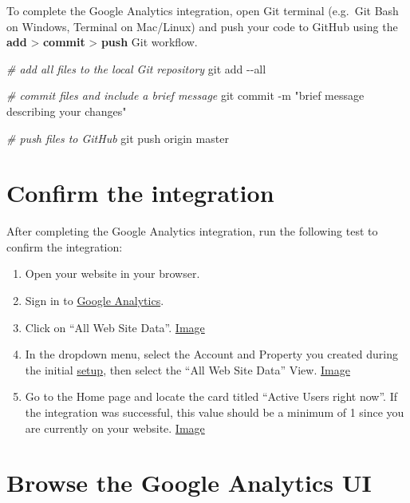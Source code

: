 \documentclass[
]{book}
\newenvironment{Shaded}{\begin{snugshade}}{\end{snugshade}}
\newcommand{\AttributeTok}[1]{\textcolor[rgb]{0.77,0.63,0.00}{#1}}
\newcommand{\CommentTok}[1]{\textcolor[rgb]{0.56,0.35,0.01}{\textit{#1}}}
\newcommand{\FunctionTok}[1]{\textcolor[rgb]{0.00,0.00,0.00}{#1}}
\newcommand{\NormalTok}[1]{#1}
\newcommand{\StringTok}[1]{\textcolor[rgb]{0.31,0.60,0.02}{#1}}
\begin{document}
To complete the Google Analytics integration, open Git terminal (e.g.~Git Bash on Windows, Terminal on Mac/Linux) and push your code to GitHub using the \textbf{add} \textgreater{} \textbf{commit} \textgreater{} \textbf{push} Git workflow.

\begin{Shaded}
\begin{Highlighting}[]
\CommentTok{\# add all files to the local Git repository}
\FunctionTok{git}\NormalTok{ add }\AttributeTok{{-}{-}all}

\CommentTok{\# commit files and include a brief message}
\FunctionTok{git}\NormalTok{ commit }\AttributeTok{{-}m} \StringTok{"brief message describing your changes"}

\CommentTok{\# push files to GitHub}
\FunctionTok{git}\NormalTok{ push origin master}
\end{Highlighting}
\end{Shaded}

\hypertarget{confirm-the-integration}{%
\section{Confirm the integration}\label{confirm-the-integration}}

After completing the Google Analytics integration, run the following test to confirm the integration:

\begin{enumerate}
\def\labelenumi{\arabic{enumi}.}
\item
  Open your website in your browser.
\item
  Sign in to \href{https://analytics.google.com/}{Google Analytics}.
\item
  Click on ``All Web Site Data''. \href{https://i.imgur.com/lyNPi8E.png}{Image}
\item
  In the dropdown menu, select the Account and Property you created during the initial \protect\hyperlink{ga-setup}{setup}, then select the ``All Web Site Data'' View. \href{https://i.imgur.com/xSjCS75.png}{Image}
\item
  Go to the Home page and locate the card titled ``Active Users right now''. If the integration was successful, this value should be a minimum of 1 since you are currently on your website. \href{https://i.imgur.com/KPbUB7G.png}{Image}
\end{enumerate}

\hypertarget{browse-the-google-analytics-ui}{%
\section{Browse the Google Analytics UI}\label{browse-the-google-analytics-ui}}
\end{document}
